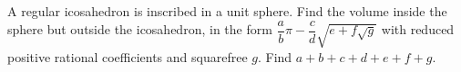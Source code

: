 A regular icosahedron is inscribed in a unit sphere. Find the volume inside the sphere but outside the icosahedron, in the form $\dfrac{a}{b}\pi-\dfrac{c}{d}\sqrt{e+f\sqrt g}$ with reduced positive rational coefficients and squarefree $g$. Find $a+b+c+d+e+f+g$.

